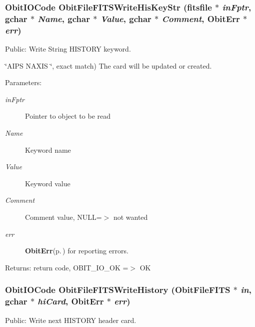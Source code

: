\subsubsection{\setlength{\rightskip}{0pt plus 5cm}Obit\-IOCode Obit\-File\-FITSWrite\-His\-Key\-Str (fitsfile $\ast$ {\em in\-Fptr}, gchar $\ast$ {\em Name}, gchar $\ast$ {\em Value}, gchar $\ast$ {\em Comment}, {\bf Obit\-Err} $\ast$ {\em err})}\label{ObitFileFITS_8c_a29}


Public: Write String HISTORY keyword. 

\char`\"{}AIPS   NAXIS   \char`\"{}, exact match) The card will be updated or created. \begin{Desc}
\item[Parameters:]
\begin{description}
\item[{\em in\-Fptr}]Pointer to object to be read \item[{\em Name}]Keyword name \item[{\em Value}]Keyword value \item[{\em Comment}]Comment value, NULL=$>$ not wanted \item[{\em err}]{\bf Obit\-Err}{\rm (p.\,\pageref{structObitErr})} for reporting errors. \end{description}
\end{Desc}
\begin{Desc}
\item[Returns:]return code, OBIT\_\-IO\_\-OK =$>$ OK \end{Desc}
\subsubsection{\setlength{\rightskip}{0pt plus 5cm}Obit\-IOCode Obit\-File\-FITSWrite\-History ({\bf Obit\-File\-FITS} $\ast$ {\em in}, gchar $\ast$ {\em hi\-Card}, {\bf Obit\-Err} $\ast$ {\em err})}\label{ObitFileFITS_8c_a26}


Public: Write next HISTORY header card. 

